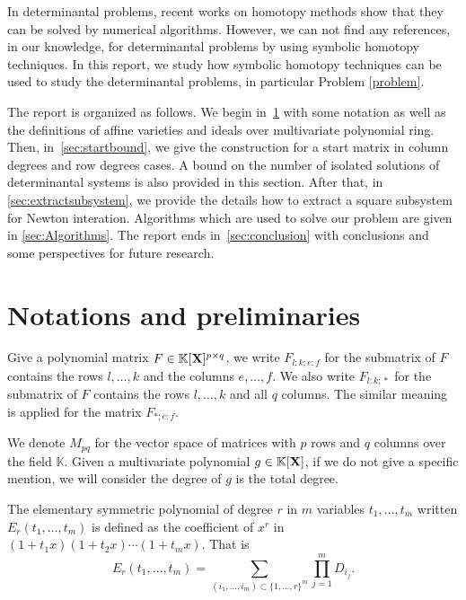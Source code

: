 \documentclass[11pt]{article}
\numberwithin{Property}{section}
\numberwithin{Theorem}{section}
\numberwithin{Proposition}{section}
\numberwithin{Lemma}{section}
\numberwithin{Corollary}{section}
\numberwithin{Definition}{section}
\numberwithin{Remark}{section}
\numberwithin{Conjecture}{section}
\numberwithin{Problem}{section}
\numberwithin{Claim}{section}
\theoremstyle{definition}
\numberwithin{Example}{section}
\newcommand{\field}{\mathbb{K}} %
\newcommand{\mat}[1]{\mathbf{\MakeUppercase{#1}}} %
\begin{document}
In determinantal problems, recent works on homotopy methods \cite{Ver89} show that they can be solved by numerical algorithms. However, we can not find any references, in our knowledge, for determinantal problems by using symbolic homotopy techniques. In this report, we study how symbolic homotopy techniques can be used to study the determinantal problems, in particular Problem \ref{problem}. 

The report is organized as follows. We begin in~\cref{sec:not} with some notation as well as the
definitions of affine varieties and ideals over multivariate polynomial ring. Then, in~\cref{sec:startbound}, we give the construction for a start matrix in column degrees and row degrees cases. A bound on the number of isolated solutions of determinantal systems is also provided in this section. After that, in \cref{sec:extractsubsystem}, we provide the details how to extract a square subsystem for Newton interation. Algorithms which are used to solve our problem are given in \cref{sec:Algorithms}. The report ends in~\cref{sec:conclusion} with conclusions and some perspectives for future research. 
\section{Notations and preliminaries}
\label{sec:not}
Give a polynomial matrix $F \in \field[\mat{X}]^{p \times q}$, we write $F_{l:k \mathbf{;} e:f}$ for the submatrix of $F$ contains the rows $l, \ldots, k$ and the columns $e, \ldots, f$. We also write $F_{l:k \mathbf{;} *}$ for the submatrix of $F$ contains the rows $l, \ldots, k$ and all $q$ columns. The similar meaning is applied for the matrix $F_{* \mathbf{;} e:f}$. 

We denote $M_{pq}$ for the vector space of matrices with $p$ rows and $q$ columns over the field $\field$. Given a multivariate polynomial $g \in \field[\mat{X}]$, if we do not give a specific mention, we will consider the degree of $g$ is the total degree.  %

The elementary symmetric polynomial of degree $r$ in $m$ variables $t_1, \ldots, t_m$ written $E_{r}(t_1, \ldots, t_m)$ is defined as the coefficient of $x^r$ in $(1+t_1x)(1+t_2x)\cdots(1+t_mx)$. That is
\[E_{r}(t_1, \ldots, t_m) = \sum_{(i_1,\ldots,i_{m}) \subset \{1, \ldots, r\}^{m}}\prod_{j =1}^{m}D_{i_j}.\]
\end{document}
